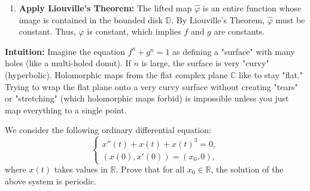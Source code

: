 \begin{solution}
\begin{enumerate}
    \item \textbf{Apply Liouville's Theorem:} The lifted map $\widehat{\varphi}$ is an entire function whose image is contained in the bounded disk $\mathbb{D}$. By Liouville's Theorem, $\widehat{\varphi}$ must be constant. Thus, $\varphi$ is constant, which implies $f$ and $g$ are constants.
\end{enumerate}

\bigskip

\textbf{Intuition:} 
Imagine the equation $f^n + g^n = 1$ as defining a "surface" with many holes (like a multi-holed donut). If $n$ is large, the surface is very "curvy" (hyperbolic). Holomorphic maps from the flat complex plane $\mathbb{C}$ like to stay "flat." Trying to wrap the flat plane onto a very curvy surface without creating "tears" or "stretching" (which holomorphic maps forbid) is impossible unless you just map everything to a single point.
\end{solution}

\begin{exercise}
\label{analysis:2020:5}
We consider the following ordinary differential equation:
\[
\begin{cases}
x''(t) + x(t) + x(t)^3 = 0,\\
(x(0),x'(0)) = (x_0,0),
\end{cases}
\]
where $x(t)$ takes values in $\mathbb{R}$. Prove that for all $x_0\in\mathbb{R}$, the solution of the above system is periodic.

\end{exercise}

